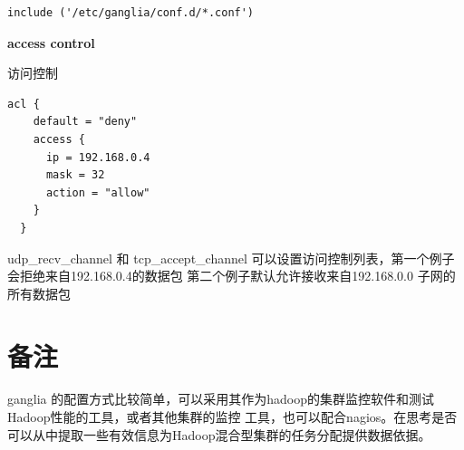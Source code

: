 \documentclass{article}
\begin{document}
\begin{verbatim}
include ('/etc/ganglia/conf.d/*.conf')
\end{verbatim}

\textbf{access control}

访问控制

\begin{verbatim}
acl {
    default = "deny"
    access {
      ip = 192.168.0.4
      mask = 32
      action = "allow"
    }
  }
\end{verbatim}

udp\_recv\_channel 和 tcp\_accept\_channel 可以设置访问控制列表，第一个例子会拒绝来自192.168.0.4的数据包
第二个例子默认允许接收来自192.168.0.0 子网的所有数据包

\section{备注}
ganglia 的配置方式比较简单，可以采用其作为hadoop的集群监控软件和测试Hadoop性能的工具，或者其他集群的监控
工具，也可以配合nagios。在思考是否可以从中提取一些有效信息为Hadoop混合型集群的任务分配提供数据依据。
\end{document}
